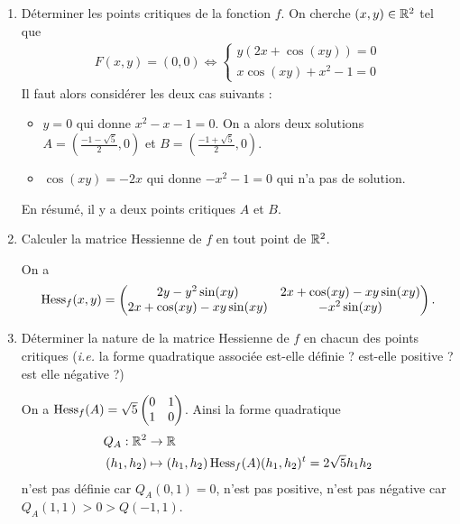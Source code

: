 \documentclass{article}
\begin{document}
\begin{enumerate}
	\item Déterminer les points critiques de la fonction $f$.
On cherche $(x,y) \in\mathbb{R}^2$ tel que
\begin{align*}
F(x,y) = (0,0) \Leftrightarrow 	\begin{cases}
		y(2x + \cos(xy) ) = 0 \\
x\cos(xy) +x^2-1 =0
	\end{cases}
\end{align*}
Il faut alors considérer les deux cas suivants :
\begin{itemize}
	\item $y=0$ qui donne $x^2 - x -1 =0$.  On a alors deux solutions $ A=(\frac{-1 -\sqrt{5}}{2} ,0)$ et $ B=(\frac{-1 +\sqrt{5}}{2} ,0)$.
	\item $\cos(xy) = -2x$ qui donne $-x^2 -1 = 0$ qui n'a pas de solution.
\end{itemize}
	En résumé, il y a deux points critiques $A$ et $B$.

	\item Calculer la matrice Hessienne de $f$ en tout point de $\mathbb{R}^2$. 

	\medskip

		On a 
		\[
			\operatorname{Hess}_f (x,y) = \begin{pmatrix}
	2 y - y^2 \sin(xy)	& 2x + \cos(xy) - xy\sin(xy)	 \\
	2x + \cos(xy) - xy\sin(xy)	& -x^2\sin(xy)
		\end{pmatrix}.
	\]

	
	\medskip

	\item Déterminer la nature de la matrice Hessienne de $f$ en chacun des points critiques  (\textit{i.e.} la forme quadratique associée est-elle définie ? est-elle positive ? est elle négative ?)

	\medskip

		On  a $\operatorname{Hess}_f(A) = \sqrt{5} \begin{pmatrix}
			0 & 1 \\ 1 & 0
		\end{pmatrix}$. Ainsi la forme quadratique 
		\begin{align*}
			Q_A : \mathbb{R}^2 &\to \mathbb{R} \\ (h_1,h_2) &\mapsto (h_1,h_2) \operatorname{Hess}_f(A) (h_1,h_2)^t = 2 \sqrt{5} h_1h_2
		\end{align*}
		n'est pas définie car $Q_A(0,1) =0 $, n'est pas positive, n'est pas négative car $Q_A(1,1) > 0> Q(-1,1)$.


\end{enumerate}
\end{document}
